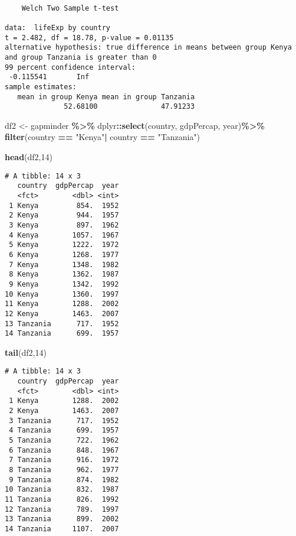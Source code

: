 \documentclass[
]{article}
\newenvironment{Shaded}{\begin{snugshade}}{\end{snugshade}}
\newcommand{\DecValTok}[1]{\textcolor[rgb]{0.00,0.00,0.81}{#1}}
\newcommand{\FunctionTok}[1]{\textcolor[rgb]{0.13,0.29,0.53}{\textbf{#1}}}
\newcommand{\NormalTok}[1]{#1}
\newcommand{\OtherTok}[1]{\textcolor[rgb]{0.56,0.35,0.01}{#1}}
\newcommand{\SpecialCharTok}[1]{\textcolor[rgb]{0.81,0.36,0.00}{\textbf{#1}}}
\newcommand{\StringTok}[1]{\textcolor[rgb]{0.31,0.60,0.02}{#1}}
\begin{document}
\begin{verbatim}

    Welch Two Sample t-test

data:  lifeExp by country
t = 2.482, df = 18.78, p-value = 0.01135
alternative hypothesis: true difference in means between group Kenya and group Tanzania is greater than 0
99 percent confidence interval:
 -0.115541       Inf
sample estimates:
   mean in group Kenya mean in group Tanzania 
              52.68100               47.91233 
\end{verbatim}

\begin{Shaded}
\begin{Highlighting}[]
\NormalTok{df2 }\OtherTok{\textless{}{-}}\NormalTok{ gapminder }\SpecialCharTok{\%\textgreater{}\%}
\NormalTok{  dplyr}\SpecialCharTok{::}\FunctionTok{select}\NormalTok{(country, gdpPercap, year)}\SpecialCharTok{\%\textgreater{}\%}
  \FunctionTok{filter}\NormalTok{(country }\SpecialCharTok{==} \StringTok{"Kenya"}\SpecialCharTok{|}
\NormalTok{           country }\SpecialCharTok{==} \StringTok{"Tanzania"}\NormalTok{)}

\FunctionTok{head}\NormalTok{(df2,}\DecValTok{14}\NormalTok{)}
\end{Highlighting}
\end{Shaded}

\begin{verbatim}
# A tibble: 14 x 3
   country  gdpPercap  year
   <fct>        <dbl> <int>
 1 Kenya         854.  1952
 2 Kenya         944.  1957
 3 Kenya         897.  1962
 4 Kenya        1057.  1967
 5 Kenya        1222.  1972
 6 Kenya        1268.  1977
 7 Kenya        1348.  1982
 8 Kenya        1362.  1987
 9 Kenya        1342.  1992
10 Kenya        1360.  1997
11 Kenya        1288.  2002
12 Kenya        1463.  2007
13 Tanzania      717.  1952
14 Tanzania      699.  1957
\end{verbatim}

\begin{Shaded}
\begin{Highlighting}[]
\FunctionTok{tail}\NormalTok{(df2,}\DecValTok{14}\NormalTok{)}
\end{Highlighting}
\end{Shaded}

\begin{verbatim}
# A tibble: 14 x 3
   country  gdpPercap  year
   <fct>        <dbl> <int>
 1 Kenya        1288.  2002
 2 Kenya        1463.  2007
 3 Tanzania      717.  1952
 4 Tanzania      699.  1957
 5 Tanzania      722.  1962
 6 Tanzania      848.  1967
 7 Tanzania      916.  1972
 8 Tanzania      962.  1977
 9 Tanzania      874.  1982
10 Tanzania      832.  1987
11 Tanzania      826.  1992
12 Tanzania      789.  1997
13 Tanzania      899.  2002
14 Tanzania     1107.  2007
\end{verbatim}
\end{document}
